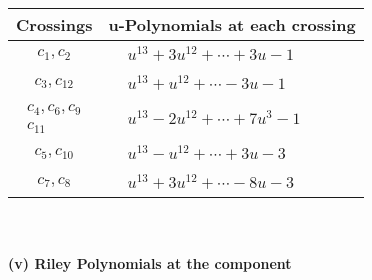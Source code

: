 \documentclass[1p]{elsarticle_modified}
\theoremstyle{definition}
\begin{document}
\begin{tabular}{m{50pt}|m{274pt}}
Crossings & \hspace{64pt}u-Polynomials at each crossing \\
\hline $$\begin{aligned}c_{1},c_{2}\end{aligned}$$&$\begin{aligned}
&u^{13}+3 u^{12}+\cdots+3 u-1
\end{aligned}$\\
\hline $$\begin{aligned}c_{3},c_{12}\end{aligned}$$&$\begin{aligned}
&u^{13}+u^{12}+\cdots-3 u-1
\end{aligned}$\\
\hline $$\begin{aligned}c_{4},c_{6},c_{9}\\c_{11}\end{aligned}$$&$\begin{aligned}
&u^{13}-2 u^{12}+\cdots+7 u^3-1
\end{aligned}$\\
\hline $$\begin{aligned}c_{5},c_{10}\end{aligned}$$&$\begin{aligned}
&u^{13}- u^{12}+\cdots+3 u-3
\end{aligned}$\\
\hline $$\begin{aligned}c_{7},c_{8}\end{aligned}$$&$\begin{aligned}
&u^{13}+3 u^{12}+\cdots-8 u-3
\end{aligned}$\\
\hline
\end{tabular}\\~\\
\newpage\renewcommand{\arraystretch}{1}
\flushleft \textbf{(v) Riley Polynomials at the component}\newline \\
\end{document}
